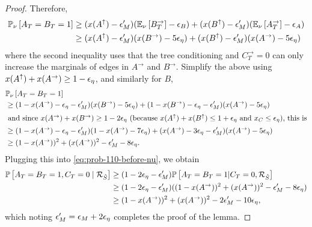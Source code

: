 \begin{proof}
Therefore, 
\begin{align*}
{\mathbb{P}}_{\nu}\left[A_T=B_T=1\right]	&\geq (x(A^\uparrow)-{\epsilon}'_M) ({\mathbb{E}}_{\nu}\left[B^\rightarrow_T\right]-{\epsilon}_B) + (x(B^\uparrow)-{\epsilon}'_M) ({\mathbb{E}}_{\nu}\left[A^\rightarrow_T\right]-{\epsilon}_A)\\
&\geq (x(A^\uparrow)-{\epsilon}'_M)  (x(B^\rightarrow)-5{\epsilon}_\eta) + (x(B^\uparrow)-{\epsilon}'_M)(x(A^\rightarrow)-5{\epsilon}_\eta)
\end{align*}
where the second inequality uses that the  tree conditioning and $C^\rightarrow_T=0$ can only increase the marginals of edges in $A^\rightarrow$ and $B^\rightarrow$.
Simplify the above using  $x(A^\uparrow)  +x(A^\rightarrow) \ge 1-{\epsilon}_\eta$, and similarly for $B$,  
\begin{align*}
	&{\mathbb{P}}_{\nu}\left[A_T=B_T=1\right] \\
	&\ge (1- x(A^\rightarrow) - {\epsilon}_\eta-{\epsilon}'_M) (x(B^\rightarrow)-5{\epsilon}_\eta) + (1- x(B^\rightarrow) - {\epsilon}_\eta -{\epsilon}'_M)(x(A^\rightarrow)-5{\epsilon}_\eta) \\ 
	\intertext{ and since $x(A^\rightarrow) + x(B^\rightarrow) \ge 1- 2{\epsilon}_\eta$ (because
$x(A^\uparrow) + x(B^\uparrow) \le 1+ {\epsilon}_\eta$ and $x_C \le {\epsilon}_\eta$), this is}
	&\ge (1- x(A^\rightarrow) - {\epsilon}_\eta-{\epsilon}'_M) (1 - x(A^\rightarrow)-7{\epsilon}_\eta) + (x(A^\rightarrow) - 3{\epsilon}_\eta -{\epsilon}'_M)(x(A^\rightarrow)-5{\epsilon}_\eta) \\
	&\ge   (1- x(A^\rightarrow))^2 + (x(A^\rightarrow))^2 -{\epsilon}'_M 
	- 8{\epsilon}_\eta.
	\end{align*}
Plugging this into \cref{eq:prob-110-before-nu}, we obtain 
\begin{align*}
{\mathbb{P}}\left[A_T=B_T=1,C_T=0 \mid {\mathcal{R}}_{\hat S}\right] &\geq (1-2{\epsilon}_\eta - {\epsilon}'_M){\mathbb{P}}\left[A_T=B_T=1 | C_T=0, {\mathcal{R}}_{\hat S}\right] \\
& \ge (1-2{\epsilon}_\eta - {\epsilon}'_M)((1- x(A^\rightarrow))^2 + (x(A^\rightarrow))^2 -{\epsilon}'_M - 8{\epsilon}_\eta) \\
& \ge (1- x(A^\rightarrow))^2 + (x(A^\rightarrow))^2 -2{\epsilon}'_M - 10{\epsilon}_\eta,
\end{align*}
which noting ${\epsilon}'_M={\epsilon}_M+2{\epsilon}_\eta$ completes the proof of the lemma. 
\end{proof}



